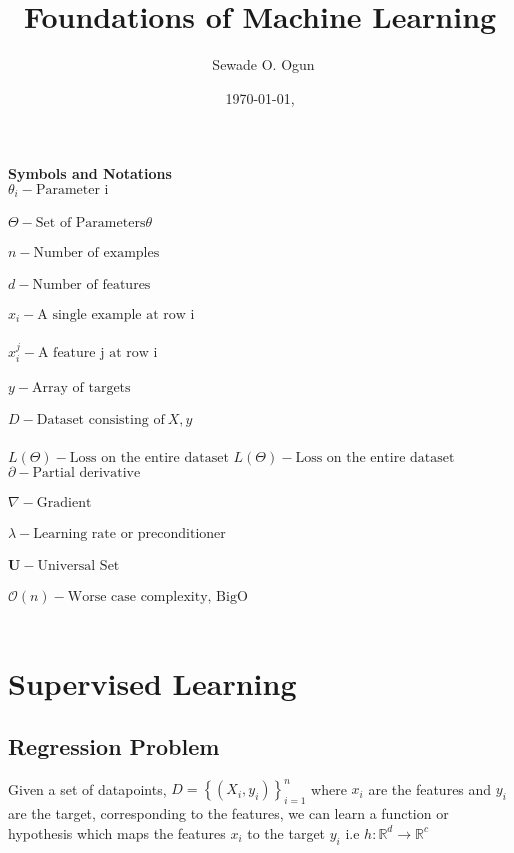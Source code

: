 \documentclass[12pt,a4paper,titlepage,landscape]{book}
\author{\text{A lesson note by}~Sewade O. Ogun}
\title{Foundations of Machine Learning}
\date{\today, \text{AIMS Ghana}}
\begin{document}
	\maketitle
	\textbf{Symbols and Notations} \\
	$\theta_i - \text{Parameter i}$ \\\\
	$\Theta - \text{Set of Parameters} \theta$ \\\\
	$n - \text{Number of examples}$ \\\\
	$d - \text{Number of features}$ \\\\
	$x_i - \text{A single example at row i}$ \\\\
	$x_i^j - \text{A feature j at row i }$ \\\\
	$y - \text{Array of targets}$ \\\\
	$D - \text{Dataset consisting of}~X,y$ \\\\
	$L(\Theta)  - \text{Loss on the entire dataset}$
	$L(\Theta)  - \text{Loss on the entire dataset}$
	$\partial - \text{Partial derivative}$ \\\\
	$\nabla - \text{Gradient}$ \\\\
	$\lambda - \text{Learning rate or preconditioner}$ \\\\
	$\mathbf{U} - \text{Universal Set}$ \\\\
	$\mathcal{O}(n) - \text{Worse case complexity, BigO}$ \\\\
	\chapter{Supervised Learning}
	\section{Regression Problem}
	
	Given a set of datapoints, $ D = \left\{\left(X_i, y_i\right)\right\}_{i=1}^n $ where $x_i$ are the features and $y_i$ are the target, corresponding to the features, we can learn a function or hypothesis which maps the features $x_i$ to the target $y_i$ i.e $h : \mathbb{R}^d \to \mathbb{R}^c $ \\
	
\end{document}
